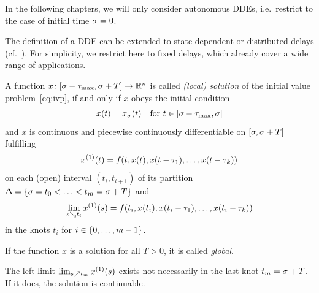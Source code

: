     In the following chapters, we will only consider autonomous DDEs, i.e.\ restrict to the case of initial time $\sigma=0$.

    The definition of a DDE can be extended to state-dependent or distributed delays (cf.~\cite{}). For simplicity, we restrict here to fixed delays, which already cover a wide range of applications.



    \begin{definition}\label{def:solution-dde}
        A function $x\colon[\sigma-\tau_{\max},\sigma+T]\to\mathbb{R}^n$ is called \emph{(local) solution} of the initial value problem~\eqref{eq:ivp}, if and only if
        $x$ obeys the initial condition
        \begin{equation*}
            x(t) = x_{\sigma}(t) \quad\text{for } t\in[\sigma-\tau_{\max},\sigma]
        \end{equation*}
        and $x$ is continuous and piecewise continuously differentiable on $[\sigma,\sigma+T]$ fulfilling
        \begin{equation*}
            \D{x}(t) = f(t,x(t),x(t-\tau_1),\ldots,x(t-\tau_k))
        \end{equation*}
        on each (open) interval $(t_i,t_{i+1})$ of its partition $\Delta=\left\{\sigma=t_0<\ldots<t_m=\sigma+T\right\}$ and
        \begin{equation*}
            \lim_{s\downto t_i}\D{x}(s) = f(t_i,x(t_i),x(t_i-\tau_1),\ldots,x(t_i-\tau_k))
        \end{equation*}
        in the knots $t_i$ for $i\in\left\{0,\ldots,m-1\right\}$.
        
        If the function $x$ is a solution for all $T>0$, it is called \emph{global}.   
    \end{definition}


    The left limit $\lim_{s\upto t_m}\D{x}(s)$ exists not necessarily in the last knot $t_m=\sigma+T$. If it does, the solution is continuable.

